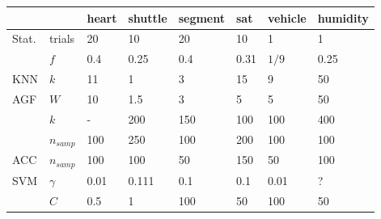 \begin{tabular}{|ll|llllll|}
	\hline
& & heart & shuttle & segment & sat & vehicle & humidity \\\hline
	Stat. & trials & 20 & 10 & 20 & 10 & 1 & 1 \\
	& $f$ & 0.4 & 0.25 & 0.4 & 0.31 & $1/9$ & 0.25 \\\hline
	KNN & $k$ & 11 & 1 & 3 & 15 & 9 & 50 \\\hline
	AGF & $W$ & 10 & 1.5 & 3 & 5 & 5 & 50 \\
 & $k$ & - & 200 & 150 & 100 & 100 & 400 \\
 &	$n_{samp}$ & 100 & 250 & 100 & 200 & 100 & 100 \\\hline
	ACC & $n_{samp}$ & 100 & 100 & 50 & 150 & 50 & 100 \\\hline
	SVM & $\gamma$ & 0.01 & 0.111 & 0.1 & 0.1 & 0.01 & ? \\
	& $C$ & 0.5 & 1 & 100 & 50 & 100 & 50\\\hline
\end{tabular}

